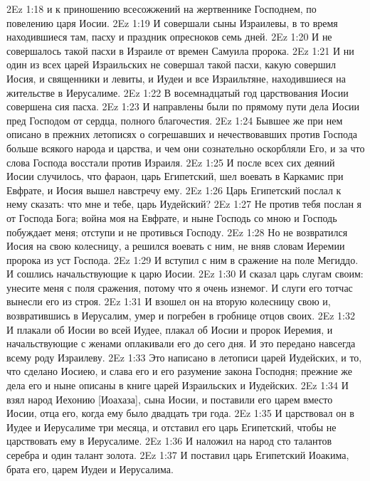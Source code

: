 \vs 2Ez 1:18 и к приношению всесожжений на жертвеннике Господнем, по повелению царя Иосии.
\vs 2Ez 1:19 И совершали сыны Израилевы, в то время находившиеся там, пасху и праздник опресноков семь дней.
\vs 2Ez 1:20 И не совершалось такой пасхи в Израиле от времен Самуила пророка.
\vs 2Ez 1:21 И ни один из всех царей Израильских не совершал такой пасхи, какую совершил Иосия, и священники и левиты, и Иудеи и все Израильтяне, находившиеся  на жительстве в Иерусалиме.
\vs 2Ez 1:22 В восемнадцатый год царствования Иосии совершена сия пасха.
\vs 2Ez 1:23 И направлены были по прямому пути дела Иосии пред Господом от сердца, полного благочестия.
\rsbpar\vs 2Ez 1:24 Бывшее же при нем описано в прежних летописях о согрешавших и нечествовавших против Господа больше всякого народа и царства, и чем они сознательно оскорбляли Его, и за что слова Господа восстали против Израиля.
\rsbpar\vs 2Ez 1:25 И после всех сих деяний Иосии случилось, что фараон, царь Египетский, шел воевать в Каркамис при Евфрате, и Иосия вышел навстречу ему.
\vs 2Ez 1:26 Царь Египетский послал к нему сказать: что мне и тебе, царь Иудейский?
\vs 2Ez 1:27 Не против тебя послан я от Господа Бога; война моя на Евфрате, и ныне Господь со мною и Господь побуждает меня; отступи и не противься Господу.
\vs 2Ez 1:28 Но не возвратился Иосия на свою колесницу, а решился воевать с ним, не вняв словам Иеремии пророка из уст Господа.
\vs 2Ez 1:29 И вступил с ним в сражение на поле Мегиддо. И сошлись начальствующие к царю Иосии.
\vs 2Ez 1:30 И сказал царь слугам своим: унесите меня с поля сражения, потому что я очень изнемог. И слуги его тотчас вынесли его из строя.
\vs 2Ez 1:31 И взошел он на вторую колесницу свою и, возвратившись в Иерусалим, умер и погребен в гробнице отцов своих.
\vs 2Ez 1:32 И плакали об Иосии во всей Иудее, плакал об Иосии и пророк Иеремия, и начальствующие с женами оплакивали его до сего дня. И это передано навсегда всему роду Израилеву.
\rsbpar\vs 2Ez 1:33 Это написано в летописи царей Иудейских, и то, что сделано Иосиею, и слава его и его разумение закона Господня; прежние же дела его и ныне  описаны в книге царей Израильских и Иудейских.
\rsbpar\vs 2Ez 1:34 И взял народ Иехонию [Иоахаза], сына Иосии, и поставили его царем вместо Иосии, отца его, когда ему было двадцать три года.
\vs 2Ez 1:35 И царствовал он в Иудее и Иерусалиме три месяца, и отставил его царь Египетский, чтобы не царствовать ему в Иерусалиме.
\vs 2Ez 1:36 И наложил на народ сто талантов серебра и один талант золота.
\vs 2Ez 1:37 И поставил царь Египетский Иоакима, брата его, царем Иудеи и Иерусалима.
